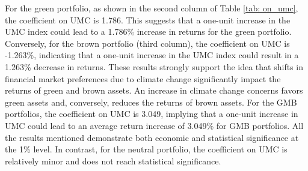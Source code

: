 \documentclass[12pt]{article}
\begin{document}
For the green portfolio, as shown in the second column of Table \ref{tab: on_umc}, the coefficient on UMC is 1.786. This suggests that a one-unit increase in the UMC index could lead to a 1.786\% increase in returns for the green portfolio. Conversely, for the brown portfolio (third column), the coefficient on UMC is -1.263\%, indicating that a one-unit increase in the UMC index could result in a 1.263\% decrease in returns. These results strongly support the idea that shifts in financial market preferences due to climate change significantly impact the returns of green and brown assets. An increase in climate change concerns favors green assets and, conversely, reduces the returns of brown assets. For the GMB portfolios, the coefficient on UMC is 3.049, implying that a one-unit increase in UMC could lead to an average return increase of 3.049\% for GMB portfolios. All the results mentioned demonstrate both economic and statistical significance at the 1\% level. In contrast, for the neutral portfolio, the coefficient on UMC is relatively minor and does not reach statistical significance.
\end{document}
